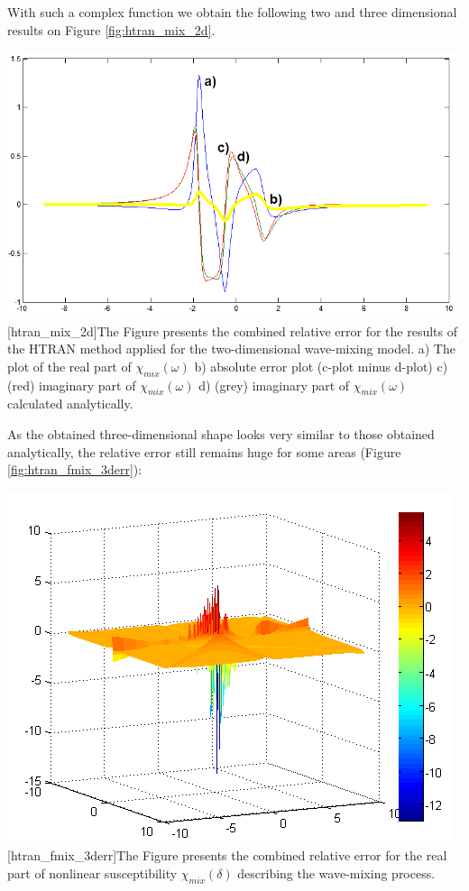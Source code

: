 \documentclass[12pt,twoside,a4paper]{article}
\numberwithin{equation}{subsection}
\numberwithin{figure}{subsection}
\begin{document}
With such a complex function we obtain the following two and three dimensional results on Figure \ref{fig:htran_mix_2d}.
 
\begin{center}
  \includegraphics[width=150mm]{img/htran_fmix_2d.png}
  [htran_mix_2d]{The Figure presents the combined relative error for the results of the HTRAN method applied for the
  two-dimensional wave-mixing model.
   a) The plot of the real part of ${\chi_{mix}}(\omega )$
   b) absolute error plot (c-plot minus d-plot)
   c) (red) imaginary part of  ${\chi_{mix}}(\omega )$
   d) (grey) imaginary part of ${\chi_{mix}}(\omega )$ calculated analytically.
   \label{fig:htran_mix_2d} 
   }
\end{center}

As the obtained three-dimensional shape looks very similar to those obtained analytically, the relative error still remains huge for some
areas (Figure \ref{fig:htran_fmix_3derr}):

\begin{center}
  \includegraphics{img/htran_fmix_3derr.png}
  [htran_fmix_3derr]{The Figure presents the combined relative error for the real part of nonlinear susceptibility
  ${\chi_{mix}}(\delta )$ describing the wave-mixing process. }
  \label{fig:htran_fmix_3derr}
\end{center}
\end{document}

